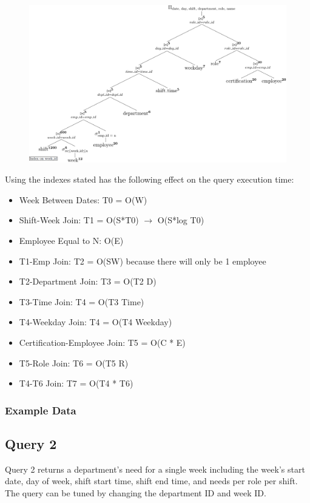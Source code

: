 \documentclass[letter,12pt]{texMemo}
\begin{document}
\begin{figure}[H]
	\centering
	\includegraphics[width=\textwidth]{query1_indexed.png}
\end{figure}
Using the indexes stated has the following effect on the query execution time:
\begin{itemize}[noitemsep,nolistsep]
	\item Week Between Dates: T0 = O(W)
	\item Shift-Week Join: T1 = O(S*T0) $\rightarrow$ O(S*log T0)
	\item Employee Equal to N: O(E)
	\item T1-Emp Join: T2 = O(SW) because there will only be 1 employee
	\item T2-Department Join: T3 = O(T2 D)
	\item T3-Time Join: T4 = O(T3 Time)
	\item T4-Weekday Join: T4 = O(T4 Weekday)
	\item Certification-Employee Join: T5 = O(C * E)
	\item T5-Role Join: T6 = O(T5 R)
	\item T4-T6 Join: T7 = O(T4 * T6)
\end{itemize}


\vspace{1em}
\subsubsection*{Example Data}
\lstset{style=smallstyle}
	\begin{center}
		
	\end{center}
\lstset{style=mystyle}

\subsection*{Query 2}
Query 2 returns a department's need for a single week including the week's start date, day of week, shift start time, shift end time, and needs per role per shift. The query can be tuned by changing the department ID and week ID.
\end{document}
